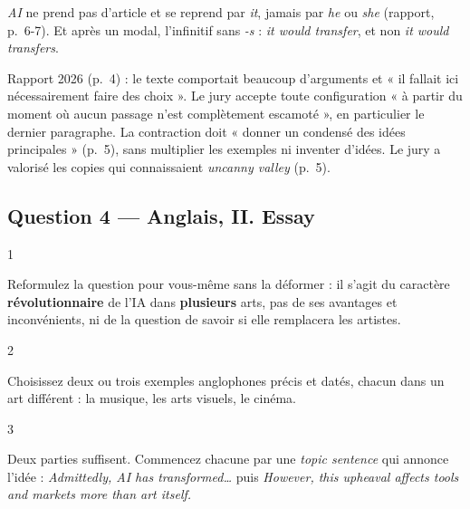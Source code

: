 \documentclass[11pt,a4paper]{article}
\begin{document}
\begin{piege}

\emph{AI} ne prend pas d'article et se reprend par \emph{it}, jamais par \emph{he} ou \emph{she} (rapport, p.~6-7). Et après un modal, l'infinitif sans \emph{-s} : \emph{it would transfer}, et non \emph{it would transfers}.

\end{piege}

\begin{jury}

Rapport 2026 (p.~4) : le texte comportait beaucoup d'arguments et « il fallait ici nécessairement faire des choix ». Le jury accepte toute configuration « à partir du moment où aucun passage n'est complètement escamoté », en particulier le dernier paragraphe. La contraction doit « donner un condensé des idées principales » (p.~5), sans multiplier les exemples ni inventer d'idées. Le jury a valorisé les copies qui connaissaient \emph{uncanny valley} (p.~5).

\end{jury}

\hypertarget{question-4-anglais-ii.-essay}{%
\subsection{Question 4 --- Anglais, II. Essay}\label{question-4-anglais-ii.-essay}}

\begin{indication}{1}

Reformulez la question pour vous-même sans la déformer : il s'agit du caractère \textbf{révolutionnaire} de l'IA dans \textbf{plusieurs} arts, pas de ses avantages et inconvénients, ni de la question de savoir si elle remplacera les artistes.

\end{indication}

\begin{indication}{2}

Choisissez deux ou trois exemples anglophones précis et datés, chacun dans un art différent : la musique, les arts visuels, le cinéma.

\end{indication}

\begin{indication}{3}

Deux parties suffisent. Commencez chacune par une \emph{topic sentence} qui annonce l'idée : \emph{Admittedly, AI has transformed\ldots{}} puis \emph{However, this upheaval affects tools and markets more than art itself.}

\end{indication}
\end{document}
